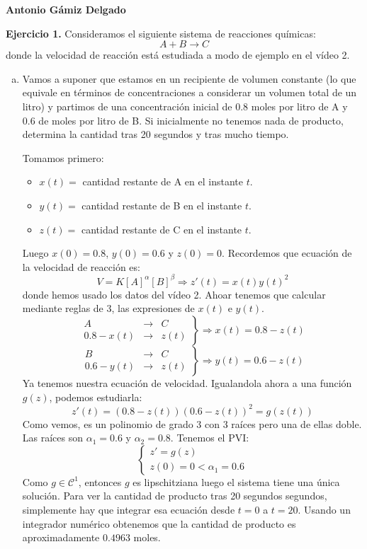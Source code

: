 \documentclass[12pt]{article}
\theoremstyle{definition}
\theoremstyle{remark}
\begin{document}
\textbf{Antonio Gámiz Delgado}


\textbf{Ejercicio 1.} Consideramos el siguiente sistema de reacciones químicas:
\[
A+B\longrightarrow C
\]
donde la velocidad de reacción está estudiada a modo de ejemplo en el vídeo 2.


\begin{enumerate}[(a)]
\item Vamos a suponer que estamos en un recipiente de volumen constante (lo que equivale en términos de concentraciones a considerar un volumen total de un litro) y partimos de una concentración inicial de 0.8 moles por litro de A y 0.6 de moles por litro de B. Si inicialmente no tenemos nada de producto, determina la cantidad tras 20 segundos y tras mucho tiempo.

Tomamos primero:
\begin{itemize}
\item $x(t) = $ cantidad restante de A en el instante $t$.
\item $y(t) = $ cantidad restante de B en el instante $t$.
\item $z(t) = $ cantidad restante de C en el instante $t$.
\end{itemize}

Luego $x(0)=0.8$, $y(0)=0.6$ y $z(0)=0$. Recordemos que ecuación de la velocidad de reacción es:
\[
V=K[A]^\alpha [B]^\beta \Rightarrow z'(t)=x(t)y(t)^2
\]
donde hemos usado los datos del vídeo 2. Ahoar tenemos que calcular mediante reglas de 3, las expresiones de $x(t)$ e $y(t)$.
\[
\left.
\begin{array}{ccc}
A & \longrightarrow & C\\
0.8-x(t) & \longrightarrow & z(t)
\end{array}
\right\} \Rightarrow x(t)=0.8-z(t)
\]
\[
\left.
\begin{array}{ccc}
B & \longrightarrow & C\\
0.6-y(t) & \longrightarrow & z(t)
\end{array}
\right\} \Rightarrow y(t)=0.6-z(t)
\]
Ya tenemos nuestra ecuación de velocidad.  Igualandola ahora a una función $g(z)$, podemos estudiarla:
\[
z'(t)=(0.8-z(t))(0.6-z(t))^2=g(z(t))
\]
Como vemos, es un polinomio de grado 3 con 3 raíces pero una de ellas doble. Las raíces son $\alpha_1=0.6$ y $\alpha_2=0.8$. Tenemos el PVI:
\[
\left\{
\begin{array}{l}
z'=g(z)\\
z(0)=0<\alpha_1=0.6
\end{array}
\right.
\]
Como $g\in\mathcal{C}^1$, entonces $g$ es lipschitziana luego el sistema tiene una única solución. Para ver la cantidad de producto tras 20 segundos segundos, simplemente hay que integrar esa ecuación desde $t=0$ a $t=20$. Usando un integrador numérico obtenemos que la cantidad de producto es aproximadamente $0.4963$ moles.


\end{enumerate}
\end{document}
